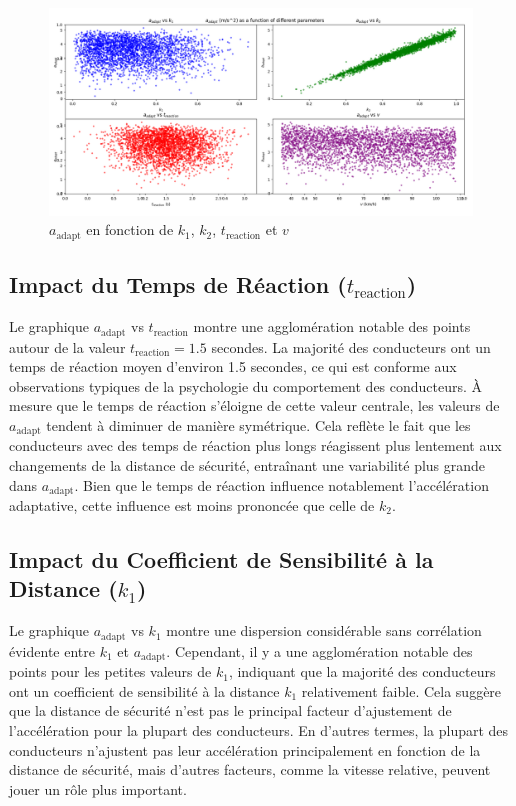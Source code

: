 \documentclass{article}
\begin{document}
\begin{figure}[h!]
    \centering
    \includegraphics[width=\linewidth]{Adaptative_acceleration.png}
    \caption{\(a_{\text{adapt}}\) en fonction de \(k_1\), \(k_2\), \(t_{\text{reaction}}\) et \(v\)}
    \label{fig:adaptative_acceleration}
\end{figure}

\subsection{Impact du Temps de Réaction (\(t_{\text{reaction}}\))}

Le graphique \(a_{\text{adapt}} \) vs \( t_{\text{reaction}} \) montre une agglomération notable des points autour de la valeur \( t_{\text{reaction}} = 1.5 \) secondes. La majorité des conducteurs ont un temps de réaction moyen d'environ 1.5 secondes, ce qui est conforme aux observations typiques de la psychologie du comportement des conducteurs. À mesure que le temps de réaction s'éloigne de cette valeur centrale, les valeurs de \(a_{\text{adapt}}\) tendent à diminuer de manière symétrique. Cela reflète le fait que les conducteurs avec des temps de réaction plus longs réagissent plus lentement aux changements de la distance de sécurité, entraînant une variabilité plus grande dans \(a_{\text{adapt}}\). Bien que le temps de réaction influence notablement l'accélération adaptative, cette influence est moins prononcée que celle de \(k_2\).

\subsection{Impact du Coefficient de Sensibilité à la Distance (\(k_1\))}

Le graphique \(a_{\text{adapt}} \) vs \( k_1 \) montre une dispersion considérable sans corrélation évidente entre \(k_1\) et \(a_{\text{adapt}}\). Cependant, il y a une agglomération notable des points pour les petites valeurs de \(k_1\), indiquant que la majorité des conducteurs ont un coefficient de sensibilité à la distance \(k_1\) relativement faible. Cela suggère que la distance de sécurité n'est pas le principal facteur d'ajustement de l'accélération pour la plupart des conducteurs. En d'autres termes, la plupart des conducteurs n'ajustent pas leur accélération principalement en fonction de la distance de sécurité, mais d'autres facteurs, comme la vitesse relative, peuvent jouer un rôle plus important.
\end{document}
